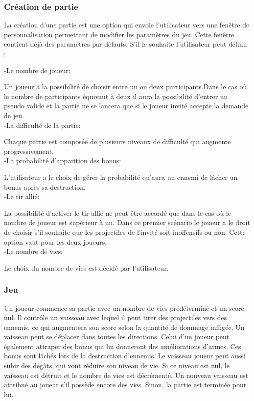 \documentclass[a4paper,12pt]{article}
\begin{document}
\subsubsection{Création de partie}
La création d'une partie est une option qui envoie l'utilisateur vers une fenêtre de personnalisation permettant de modifier les paramètres du jeu.
Cette fenêtre contient déjà des paramètres par défauts.
S'il le souhaite l'utilisateur peut définir :

-Le nombre de joueur: 

Un joueur a la possibilité de choisir entre un ou deux participants.Dans le cas où le nombre de participants équivaut à deux il aura la possibilité d'entrer un pseudo valide et la partie ne se lancera que si le joueur invité accepte la demande de jeu. \\

-La difficulté de la partie: 

Chaque partie est composée de plusieurs niveaux de difficulté qui augmente progressivement.  \\

-La probabilité d'apparition des bonus:

L'utilisateur a le choix de gérer la probabilité qu'aura un ennemi de lâcher un bonus après sa destruction. \\

-Le tir allié: 

La possibilité d'activer le tir allié ne peut être accordé que dans le cas où le nombre de joueur est supérieur à un.
Dans ce premier scénario le joueur a le droit de choisir s'il souhaite que les projectiles de l'invité soit inoffensifs ou non. Cette option vaut pour les deux joueurs. \\

-Le nombre de vies: 

Le choix du nombre de vies est décidé par l'utilisateur. \\

\subsubsection{Jeu}

Un joueur commence sa partie avec un nombre de vies prédéterminé et un score nul. 
Il contrôle un vaisseau avec lequel il peut tirer des projectiles vers des ennemis, ce qui augmentera son score selon la quantité de dommage infligée. Un vaisseau peut se déplacer dans toutes les directions. Celui d'un joueur peut également attraper des bonus qui lui donneront des améliorations d'armes. Ces bonus sont lâchés lors de la destruction d'ennemis. Le vaisseau joueur peut aussi subir des dégâts, qui vont réduire son niveau de vie. Si ce niveau est nul, le vaisseau est détruit et le nombre de vies est décrémenté. Un nouveau vaisseau est attribué au joueur s'il possède encore des vies. Sinon, la partie est terminée pour lui.
\end{document}
